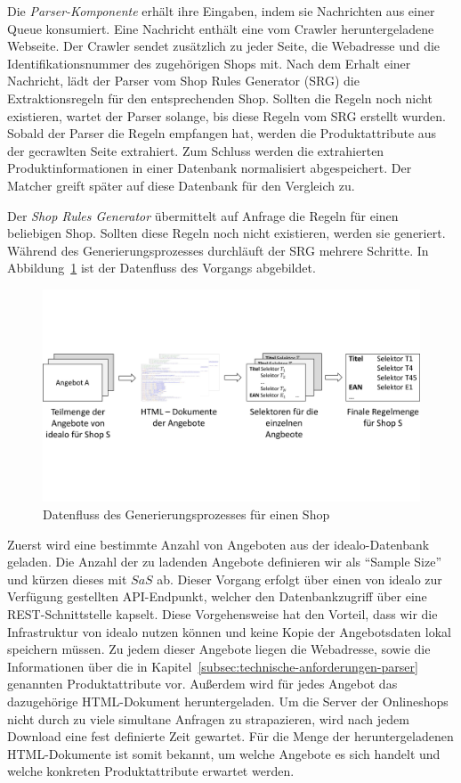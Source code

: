 Die \textit{Parser-Komponente} erhält ihre Eingaben, indem sie Nachrichten aus einer Queue konsumiert.
Eine Nachricht enthält eine vom Crawler heruntergeladene Webseite.
Der Crawler sendet zusätzlich zu jeder Seite, die Webadresse und die Identifikationsnummer des zugehörigen Shops mit.
Nach dem Erhalt einer Nachricht, lädt der Parser vom Shop Rules Generator (SRG) die Extraktionsregeln für den
entsprechenden Shop.
Sollten die Regeln noch nicht existieren, wartet der Parser solange, bis diese Regeln vom SRG erstellt wurden.
Sobald der Parser die Regeln empfangen hat, werden die Produktattribute aus der gecrawlten Seite extrahiert.
Zum Schluss werden die extrahierten Produktinformationen in einer Datenbank normalisiert abgespeichert.
Der Matcher greift später auf diese Datenbank für den Vergleich zu.

Der \textit{Shop Rules Generator} übermittelt auf Anfrage die Regeln für einen beliebigen Shop.
Sollten diese Regeln noch nicht existieren, werden sie generiert.
Während des Generierungsprozesses durchläuft der SRG mehrere Schritte.
In Abbildung~\ref{abb:datenfluss-srg} ist der Datenfluss des Vorgangs abgebildet.

\begin{figure}[H]
    \centering
    \includegraphics[width=\textwidth, trim=0 5cm 0 5cm, clip]{resources/Datenfluss-SRG.pdf}
    \caption{Datenfluss des Generierungsprozesses für einen Shop}
    \label{abb:datenfluss-srg}
\end{figure}

Zuerst wird eine bestimmte Anzahl von Angeboten aus der idealo-Datenbank geladen.
Die Anzahl der zu ladenden Angebote definieren wir als ``Sample Size'' und kürzen dieses mit $SaS$ ab.
Dieser Vorgang erfolgt über einen von idealo zur Verfügung gestellten API-Endpunkt, welcher den Datenbankzugriff über
eine REST-Schnittstelle kapselt.
Diese Vorgehensweise hat den Vorteil, dass wir die Infrastruktur von idealo nutzen können und keine Kopie der
Angebotsdaten lokal speichern müssen.
Zu jedem dieser Angebote liegen die Webadresse, sowie die Informationen über die in
Kapitel~\ref{subsec:technische-anforderungen-parser} genannten Produktattribute vor.
Außerdem wird für jedes Angebot das dazugehörige HTML-Dokument heruntergeladen.
Um die Server der Onlineshops nicht durch zu viele simultane Anfragen zu strapazieren, wird nach jedem
Download eine fest definierte Zeit gewartet.
Für die Menge der heruntergeladenen HTML-Dokumente ist somit bekannt, um welche Angebote es sich handelt und welche
konkreten Produktattribute erwartet werden.

